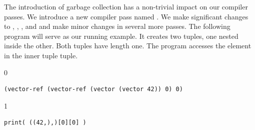 \documentclass[7x10]{TimesAPriori_MIT}%
\def\racketEd{0}
\def\pythonEd{1}
\def\edition{1}
\newtheorem{exercise}[theorem]{Exercise}
\begin{document}



The introduction of garbage collection has a non-trivial impact on our
compiler passes. We introduce a new compiler pass named
. We make significant changes to
, ,
, and  and
make minor changes in several more passes.  The following program will
serve as our running example.  It creates two tuples, one nested
inside the other. Both tuples have length one. The program accesses
the element in the inner tuple tuple.
{\if\edition\racketEd
\begin{lstlisting}
(vector-ref (vector-ref (vector (vector 42)) 0) 0)
\end{lstlisting}
\fi}
{\if\edition\pythonEd
\begin{lstlisting}
print( ((42,),)[0][0] )
\end{lstlisting}
\fi}
\end{document}
